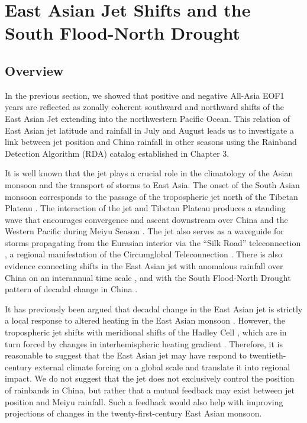 \section{East Asian Jet Shifts and the South Flood-North Drought}

\subsection{Overview}

	In the previous section, we showed that positive and negative All-Asia EOF1 years are reflected as zonally coherent southward and northward shifts of the East Asian Jet extending into the northwestern Pacific Ocean. This relation of East Asian jet latitude and rainfall in July and August leads us to investigate a link between jet position and China rainfall in other seasons using the Rainband Detection Algorithm (RDA) catalog established in Chapter 3. 
	
	It is well known that the jet plays a crucial role in the climatology of the Asian monsoon and the transport of storms to East Asia. The onset of the South Asian monsoon corresponds to the passage of the tropospheric jet north of the Tibetan Plateau \citep{Yin1949,Yeh1959,Hahn1975}. The interaction of the jet and Tibetan Plateau produces a standing wave that encourages convergence and ascent downstream over China and the Western Pacific during Meiyu Season \citep{Yang2002,Molnar2010,Chen2014}. The jet also serves as a waveguide for storms propagating from the Eurasian interior via the ``Silk Road'' teleconnection \citep{Kosaka2012}, a regional manifestation of the Circumglobal Teleconnection \citep{Hoskins1993,Ambrizzi1997,Park1997}. There is also evidence connecting shifts in the East Asian jet with anomalous rainfall over China on an interannual time scale \citep{Liang1998,Du2009,Li2014}, and with the South Flood-North Drought pattern of decadal change in China \citep{Yu2004,Yu2007,Xuan2011}. 
	
	It has previously been argued that decadal change in the East Asian jet is strictly a local response to altered heating in the East Asian monsoon \citep{Yu2007}. However, the tropospheric jet shifts with meridional shifts of the Hadley Cell \citep{Kang2011a}, which are in turn forced by changes in interhemispheric heating gradient \citep{Chiang2012,Donohoe2013,Schneider2014}. Therefore, it is reasonable to suggest that the East Asian jet may have respond to twentieth-century external climate forcing on a global scale and translate it into regional impact. We do not suggest that the jet does not exclusively control the position of rainbands in China, but rather that a mutual feedback may exist between jet position and Meiyu rainfall. Such a feedback would also help with improving projections of changes in the twenty-first-century East Asian monsoon.
	
